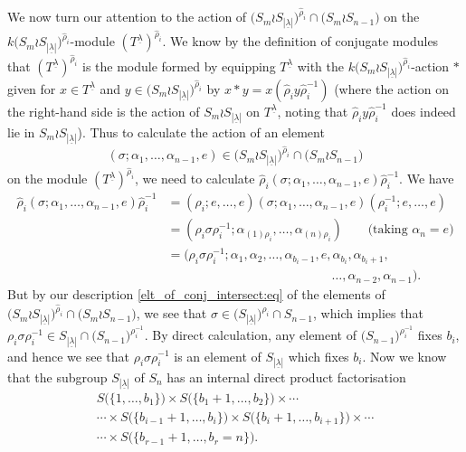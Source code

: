 \documentclass[10pt]{article}
\theoremstyle{definition}
\newcommand{\ul}[1]{\underline{#1}}
\begin{document}
We now turn our attention to the action of
$\bigl(S_m \wr S_{|\ul{\lambda}|}\bigr)^{\hat\rho_i}\cap\bigl(S_m \wr S_{n-1}\bigr)$
on the
$k\bigl(S_m \wr S_{|\ul{\lambda}|}\bigr)^{\hat\rho_i}$-module $\left(T^{\ul{\lambda}}\right)^{\hat\rho_i}$.
We know by the definition of conjugate modules that $\left(T^{\ul{\lambda}}\right)^{\hat\rho_i}$ is the module formed by equipping
$T^{\ul{\lambda}}$ with the $k\bigl(S_m \wr S_{|\ul{\lambda}|}\bigr)^{\hat\rho_i}$-action $\ast$ given for $x \in T^{\ul{\lambda}}$ and
$y \in \bigl(S_m \wr S_{|\ul{\lambda}|}\bigr)^{\hat\rho_i}$ by $x \ast y = x (\hat\rho_iy\hat\rho_i^{-1})$ (where the action on the
right-hand side is the action of $S_m \wr S_{|\ul{\lambda}|}$ on $T^{\ul{\lambda}}$, noting that $\hat\rho_iy\hat\rho_i^{-1}$ does indeed
lie in $S_m \wr S_{|\ul{\lambda}|}$). Thus to calculate the action of an element
\[(\sigma;\alpha_1,\ldots,\alpha_{n-1},e) \in \bigl(S_m \wr S_{|\ul{\lambda}|}\bigr)^{\hat\rho_i}\cap\bigl(S_m \wr S_{n-1}\bigr)\]
on the module $\left(T^{\ul{\lambda}}\right)^{\hat\rho_i}$, we need to calculate
$\hat\rho_i(\sigma;\alpha_1,\ldots,\alpha_{n-1},e)\hat\rho_i^{-1}$. We have
\begin{align*}
\hat\rho_i(\sigma;\alpha_1,\ldots,\alpha_{n-1},e)\hat\rho_i^{-1}
&= (\rho_i;e,\ldots,e)(\sigma;\alpha_1,\ldots,\alpha_{n-1},e)(\rho_i^{-1};e,\ldots,e)\\
&= (\rho_i\sigma\rho_i^{-1};\alpha_{(1)\rho_i},\ldots,\alpha_{(n)\rho_i})\qquad \text{(taking $\alpha_n = e$)}\\
&= (\rho_i\sigma\rho_i^{-1};\alpha_1,\alpha_2,\ldots,\alpha_{b_i-1},e,\alpha_{b_i},\alpha_{b_i+1},\\
&\hspace{13em}\ldots,\alpha_{n-2},\alpha_{n-1}).
\end{align*}
But by our description \eqref{elt_of_conj_intersect:eq} of the elements of
$\bigl(S_m \wr S_{|\ul{\lambda}|}\bigr)^{\hat\rho_i}\cap\bigl(S_m \wr S_{n-1}\bigr)$, we see that
$\sigma \in \bigl(S_{|\ul{\lambda}|}\bigr)^{\rho_i}\cap S_{n-1}$, which implies that
$\rho_i\sigma\rho_i^{-1} \in S_{|\ul{\lambda}|}\cap \bigl(S_{n-1}\bigr)^{\rho^{-1}_i}$. By direct calculation, any element of
$\bigl(S_{n-1}\bigr)^{\rho^{-1}_i}$ fixes $b_i$, and hence we see that $\rho_i\sigma\rho_i^{-1}$ is an element of
$S_{|\ul{\lambda}|}$ which fixes $b_i$.
Now we know that the subgroup $S_{|\ul{\lambda}|}$ of $S_n$ has an internal direct product factorisation
\begin{multline*}
S\bigl(\{1,\ldots,b_1\}\bigr) \times S\bigl(\{b_1+1,\ldots,b_2\}\bigr) \times \cdots\\
\cdots\times S\bigl(\{b_{i-1}+1,\ldots,b_i\}\bigr)\times S\bigl(\{b_i+1,\ldots,b_{i+1}\}\bigr)\times\cdots\\
\cdots \times S\bigl(\{b_{r-1}+1,\ldots,b_r = n\}\bigr).
\end{multline*}
\end{document}

